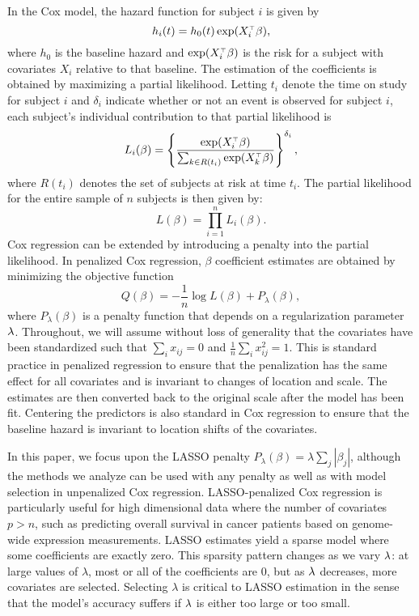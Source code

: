 \par In the Cox model, the hazard function for subject $i$ is given by 
\begin{equation*}
  h_{i}(t) = h_{0}(t) \exp( X_{i}^{\scriptscriptstyle\top}\beta),
\end{equation*} 
where $h_{0}$ is the baseline hazard and $\exp(X_i^{\scriptscriptstyle\top}\beta)$ is the risk for a subject with covariates $X_i$ relative to that baseline.  The estimation of the coefficients is obtained by maximizing a partial likelihood.  Letting $t_i$ denote the time on study for subject $i$ and $\delta_{i}$ indicate whether or not an event is observed for subject $i$, each subject's individual contribution to that partial likelihood is
\begin{equation}
  \label{eq:cox-pl-subj}
  L_{i}(\beta) = \left \{\frac{\exp ( X_{i}^{\scriptscriptstyle\top}\beta)}{\sum_{ k \in R(t_{i})}\exp ( X_{k}^{\scriptscriptstyle\top} \beta)}\right \}^{\delta_{i}},
\end{equation}
where $R(t_{i})$ denotes the set of subjects at risk at time $t_{i}$.  The partial likelihood for the entire sample of $n$ subjects is then given by:
\begin{equation}
  \label{eq:cox-pl-sum}
  L(\beta) =\prod_{i = 1}^{n} L_{i}(\beta).
\end{equation}
Cox regression can be extended by introducing a penalty into the partial likelihood.  In penalized Cox regression, $\beta$ coefficient estimates are obtained by minimizing the objective function
\begin{equation}
  \label{eq:obj}
  Q(\beta) = - \frac{1}{n} \log L(\beta) + P_{\lambda}(\beta),
\end{equation}
where $P_{\lambda}(\beta)$ is a penalty function that depends on a regularization parameter $\lambda$.  Throughout, we will assume without loss of generality that the covariates have been standardized such that $\sum_i x_{ij} = 0$ and $\tfrac{1}{n}\sum_i x_{ij}^2=1$.  This is standard practice in penalized regression to ensure that the penalization has the same effect for all covariates and is invariant to changes of location and scale.  The estimates are then converted back to the original scale after the model has been fit.  Centering the predictors is also standard in Cox regression to ensure that the baseline hazard is invariant to location shifts of the covariates.

\par In this paper, we focus upon the LASSO penalty $P_{\lambda}(\beta) = \lambda \sum_{j} |\beta_{j}|$, although the methods we analyze can be used with any penalty as well as with model selection in unpenalized Cox regression. LASSO-penalized Cox regression is particularly useful for high dimensional data where the number of covariates $p > n$, such as predicting overall survival in cancer patients based on genome-wide expression measurements. LASSO estimates yield a sparse model where some coefficients are exactly zero. This sparsity pattern changes as we vary $\lambda$: at large values of $\lambda$, most or all of the coefficients are 0, but as $\lambda$ decreases, more covariates are selected. Selecting $\lambda$ is critical to LASSO estimation in the sense that the model's accuracy suffers if $\lambda$ is either too large or too small.

